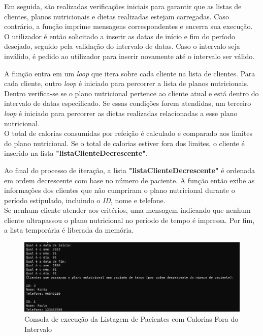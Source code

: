 \documentclass{article}
\begin{document}
Em seguida, são realizadas verificações iniciais para garantir que as listas de clientes, planos nutricionais e dietas realizadas estejam carregadas. Caso contrário, a função imprime mensagens correspondentes e encerra sua execução.\\

O utilizador é então solicitado a inserir as datas de início e fim do período desejado, seguido pela validação do intervalo de datas. Caso o intervalo seja inválido, é pedido ao utilizador para inserir novamente até o intervalo ser válido.

A função entra em um \emph{loop} que itera sobre cada cliente na lista de clientes. Para cada cliente, outro \emph{loop} é iniciado para percorrer a lista de planos nutricionais. Dentro verifica-se se o plano nutricional pertence ao cliente atual e está dentro do intervalo de datas especificado. Se essas condições forem atendidas, um terceiro \emph{loop} é iniciado para percorrer as dietas realizadas relacionadas a esse plano nutricional.\\ 

O total de calorias consumidas por refeição é calculado e comparado aos limites do plano nutricional. Se o total de calorias estiver fora dos limites, o cliente é inserido na lista \textbf{"listaClienteDecrescente"}.

Ao final do processo de iteração, a lista \textbf{"listaClienteDecrescente"} é ordenada em ordem decrescente com base no número de paciente. A função então exibe as informações dos clientes que não cumpriram o plano nutricional durante o período estipulado, incluindo o \textit{ID}, nome e telefone.\\

Se nenhum cliente atender aos critérios, uma mensagem indicando que nenhum cliente ultrapassou o plano nutricional no período de tempo é impressa. Por fim, a lista temporária é liberada da memória.

\begin{figure}[hbt!]
    \centering
    \includegraphics[width=0.9\linewidth]{Ponto3.png}
    \caption{Consola de execução da Listagem de Pacientes com Calorias Fora do Intervalo}
    \label{fig:enter-label}
\end{figure}
\end{document}
